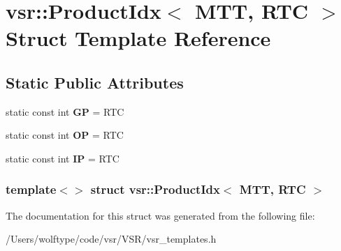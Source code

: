\hypertarget{structvsr_1_1_product_idx_3_01_m_t_t_00_01_r_t_c_01_4}{\section{vsr\-:\-:Product\-Idx$<$ M\-T\-T, R\-T\-C $>$ Struct Template Reference}
\label{structvsr_1_1_product_idx_3_01_m_t_t_00_01_r_t_c_01_4}
}
\subsection*{Static Public Attributes}
\begin{DoxyCompactItemize}
\item 
\hypertarget{structvsr_1_1_product_idx_3_01_m_t_t_00_01_r_t_c_01_4_a346636313f4384f79169b72958bda10e}{static const int {\bfseries G\-P} = R\-T\-C}\label{structvsr_1_1_product_idx_3_01_m_t_t_00_01_r_t_c_01_4_a346636313f4384f79169b72958bda10e}

\item 
\hypertarget{structvsr_1_1_product_idx_3_01_m_t_t_00_01_r_t_c_01_4_abad30f10ebd609f253165e37c3f159f0}{static const int {\bfseries O\-P} = R\-T\-C}\label{structvsr_1_1_product_idx_3_01_m_t_t_00_01_r_t_c_01_4_abad30f10ebd609f253165e37c3f159f0}

\item 
\hypertarget{structvsr_1_1_product_idx_3_01_m_t_t_00_01_r_t_c_01_4_aaff43981dae50272e1a3b4df07d37c8a}{static const int {\bfseries I\-P} = R\-T\-C}\label{structvsr_1_1_product_idx_3_01_m_t_t_00_01_r_t_c_01_4_aaff43981dae50272e1a3b4df07d37c8a}

\end{DoxyCompactItemize}
\subsubsection*{template$<$$>$ struct vsr\-::\-Product\-Idx$<$ M\-T\-T, R\-T\-C $>$}



The documentation for this struct was generated from the following file\-:\begin{DoxyCompactItemize}
\item 
/\-Users/wolftype/code/vsr/\-V\-S\-R/vsr\-\_\-templates.\-h\end{DoxyCompactItemize}
